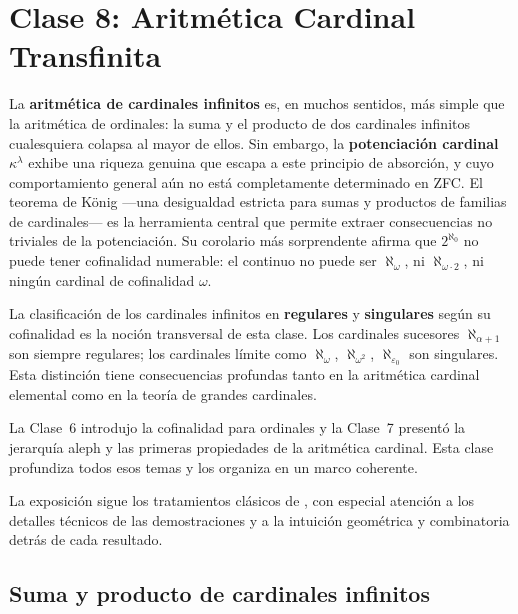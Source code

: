 \chapter{Clase 8: Aritmética Cardinal Transfinita}

La \textbf{aritmética de cardinales infinitos} es, en muchos sentidos, más simple que la aritmética de ordinales: la suma y el producto de dos cardinales infinitos cualesquiera colapsa al mayor de ellos. Sin embargo, la \textbf{potenciación cardinal} $\kappa^\lambda$ exhibe una riqueza genuina que escapa a este principio de absorción, y cuyo comportamiento general aún no está completamente determinado en ZFC. El teorema de König —una desigualdad estricta para sumas y productos de familias de cardinales— es la herramienta central que permite extraer consecuencias no triviales de la potenciación. Su corolario más sorprendente afirma que $2^{\aleph_0}$ no puede tener cofinalidad numerable: el continuo no puede ser $\aleph_\omega$, ni $\aleph_{\omega \cdot 2}$, ni ningún cardinal de cofinalidad $\omega$.

La clasificación de los cardinales infinitos en \textbf{regulares} y \textbf{singulares} según su cofinalidad es la noción transversal de esta clase. Los cardinales sucesores $\aleph_{\alpha+1}$ son siempre regulares; los cardinales límite como $\aleph_\omega$, $\aleph_{\omega^2}$, $\aleph_{\varepsilon_0}$ son singulares. Esta distinción tiene consecuencias profundas tanto en la aritmética cardinal elemental como en la teoría de grandes cardinales.

La Clase~6 introdujo la cofinalidad para ordinales y la Clase~7 presentó la jerarquía aleph y las primeras propiedades de la aritmética cardinal. Esta clase profundiza todos esos temas y los organiza en un marco coherente.

La exposición sigue los tratamientos clásicos de \cite{jech2003, kunen2011, enderton1977, hrbacek1999}, con especial atención a los detalles técnicos de las demostraciones y a la intuición geométrica y combinatoria detrás de cada resultado.

\section{Suma y producto de cardinales infinitos}

